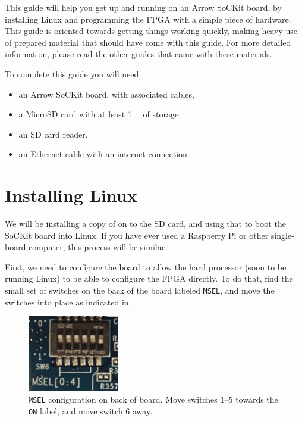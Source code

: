 \documentclass{sockitguide}
\begin{document}

This guide will help you get up and running on an Arrow SoCKit board,
by installing Linux and programming the FPGA with a simple piece of
hardware. This guide is oriented towards getting things working
quickly, making heavy use of prepared material that should have come
with this guide. For more detailed information, please read the other
guides that came with these materials.

To complete this guide you will need
\begin{itemize}
\item an Arrow SoCKit board, with associated cables,
\item a MicroSD card with at least \SI{1}{\gibi\byte} of storage,
\item an SD card reader,
\item an Ethernet cable with an internet connection.
\end{itemize}

\section{Installing Linux}

We will be installing a copy of  on to the SD card, and using that to
boot the SoCKit board into Linux. If you have ever used a Raspberry Pi
or other single-board computer, this process will be similar.

First, we need to configure the board to allow the hard processor
(soon to be running Linux) to be able to configure the FPGA
directly. To do that, find the small set of switches on the back of
the board labeled \texttt{MSEL}, and move the switches into place as indicated in .

\begin{figure}[h]
  \includegraphics[width=4cm]{figures/msel.png}
  \caption{\texttt{MSEL} configuration on back of board. Move switches
    \numrange{1}{5} towards the \texttt{ON} label, and move switch
    \num{6} away.}
  \label{fig:msel}
\end{figure}
\end{document}
